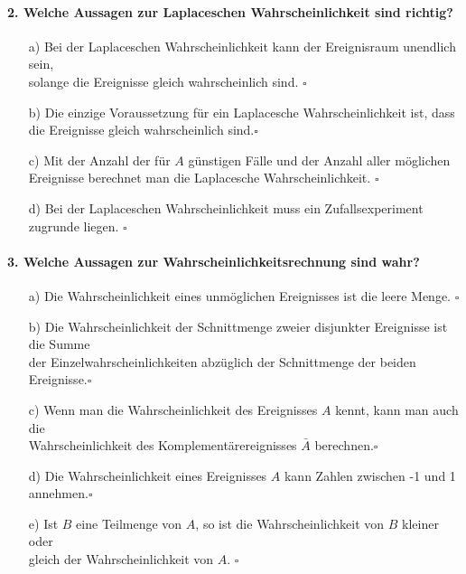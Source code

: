 \documentclass[a4paper]{article}
\begin{document}
\paragraph{2. Welche Aussagen zur Laplaceschen Wahrscheinlichkeit sind richtig?}
\begin{itemize}
    \item [a)] Bei der Laplaceschen Wahrscheinlichkeit kann der Ereignisraum unendlich sein,\\ solange die Ereignisse gleich wahrscheinlich sind. \hfill $\square$
    \item[b)] Die einzige Voraussetzung für ein Laplacesche Wahrscheinlichkeit ist, dass \\die Ereignisse gleich wahrscheinlich sind.\hfill $\square$
    \item[c)] Mit der Anzahl der für $A$ günstigen Fälle und der Anzahl aller möglichen\\ Ereignisse berechnet man die Laplacesche Wahrscheinlichkeit. \hfill $\square$
    \item[d)] Bei der Laplaceschen Wahrscheinlichkeit muss ein Zufallsexperiment zugrunde liegen. \hfill $\square$
\end{itemize}

\paragraph{3. Welche Aussagen zur Wahrscheinlichkeitsrechnung sind wahr?} 
\begin{itemize}
    \item[a)] Die Wahrscheinlichkeit eines unmöglichen Ereignisses ist die leere Menge. \hfill $\square$
    \item[b)] Die Wahrscheinlichkeit der Schnittmenge zweier disjunkter Ereignisse ist die Summe\\ der Einzelwahrscheinlichkeiten abzüglich der  Schnittmenge der beiden Ereignisse.\hfill $\square$
    \item[c)] Wenn man die Wahrscheinlichkeit des Ereignisses $A$ kennt, kann man auch die\\ Wahrscheinlichkeit des Komplementärereignisses $\bar A$ berechnen.\hfill $\square$
    \item[d)] Die Wahrscheinlichkeit eines Ereignisses $A$ kann Zahlen zwischen -1 und 1 annehmen.\hfill $\square$
    \item[e)] Ist $B$ eine Teilmenge von $A$, so ist die Wahrscheinlichkeit von $B$ kleiner oder \\gleich der Wahrscheinlichkeit von $A$. \hfill $\square$
\end{itemize}
\end{document}
